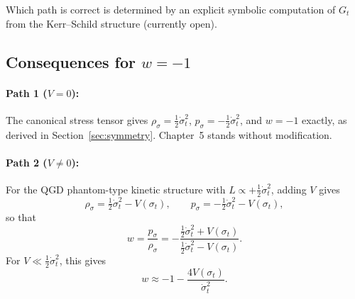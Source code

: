 \documentclass[11pt,a4paper]{article}
\theoremstyle{plain}
\theoremstyle{definition}
\theoremstyle{remark}
\newcommand{\dotv}{\dot\sigma_t}
\begin{document}
Which path is correct is determined by an explicit symbolic computation
of $G_t$ from the Kerr--Schild structure (currently open).

\subsection{Consequences for $w = -1$}
\label{sec:w_modified}

\paragraph{Path 1 ($V = 0$):}
The canonical stress tensor gives $\rho_\sigma = \tfrac{1}{2}\dotv^2$,
$p_\sigma = -\tfrac{1}{2}\dotv^2$, and $w = -1$ exactly, as derived in
Section~\ref{sec:symmetry}.  Chapter~5 stands without modification.

\paragraph{Path 2 ($V \neq 0$):}
For the QGD phantom-type kinetic structure with $L \propto
+\tfrac{1}{2}\dotv^2$, adding $V$ gives
\begin{equation}
  \rho_\sigma = \tfrac{1}{2}\dotv^2 - V(\sigma_t), \qquad
  p_\sigma    = -\tfrac{1}{2}\dotv^2 - V(\sigma_t),
\end{equation}
so that
\begin{equation}
  \boxed{w = \frac{p_\sigma}{\rho_\sigma}
  = -\frac{\tfrac{1}{2}\dotv^2 + V(\sigma_t)}
          {\tfrac{1}{2}\dotv^2 - V(\sigma_t)}.}
  \label{eq:w_modified}
\end{equation}
For $V \ll \tfrac{1}{2}\dotv^2$, this gives
\begin{equation}
  w \approx -1 - \frac{4V(\sigma_t)}{\dotv^2}.
  \label{eq:w_approx}
\end{equation}
\end{document}
